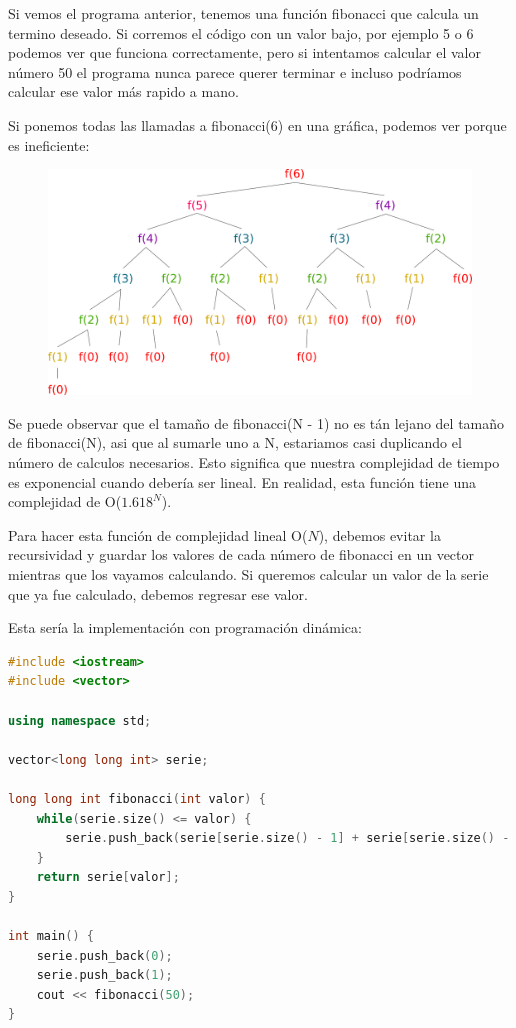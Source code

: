 \documentclass{article}
\begin{document}
Si vemos el programa anterior, tenemos una función fibonacci que calcula un termino deseado. Si corremos el código con un valor bajo, por ejemplo 5 o 6 podemos ver que funciona correctamente, pero si intentamos calcular el valor número 50 el programa nunca parece querer terminar e incluso podríamos calcular ese valor más rapido a mano.

Si ponemos todas las llamadas a fibonacci(6) en una gráfica, podemos ver porque es ineficiente:

\begin{figure}[H]
    \centering
    \includegraphics[width=0.4\paperwidth]{fibonacci}
\end{figure}

Se puede observar que el tamaño de fibonacci(N - 1) no es tán lejano del tamaño de fibonacci(N), asi que al sumarle uno a N, estariamos casi duplicando el número de calculos necesarios. Esto significa que nuestra complejidad de tiempo es exponencial cuando debería ser lineal. En realidad, esta función tiene una complejidad de O($1.618^N$).

Para hacer esta función de complejidad lineal O($N$), debemos evitar la recursividad y guardar los valores de cada número de fibonacci en un vector mientras que los vayamos calculando. Si queremos calcular un valor de la serie que ya fue calculado, debemos regresar ese valor.

Esta sería la implementación con programación dinámica:

\begin{lstlisting}[language=C++, caption=Programación dinámica]
#include <iostream>
#include <vector>

using namespace std;

vector<long long int> serie;

long long int fibonacci(int valor) {
    while(serie.size() <= valor) {
        serie.push_back(serie[serie.size() - 1] + serie[serie.size() - 2]);
    }
    return serie[valor];
}

int main() {
    serie.push_back(0);
    serie.push_back(1);
    cout << fibonacci(50);
}
\end{lstlisting}
\end{document}
